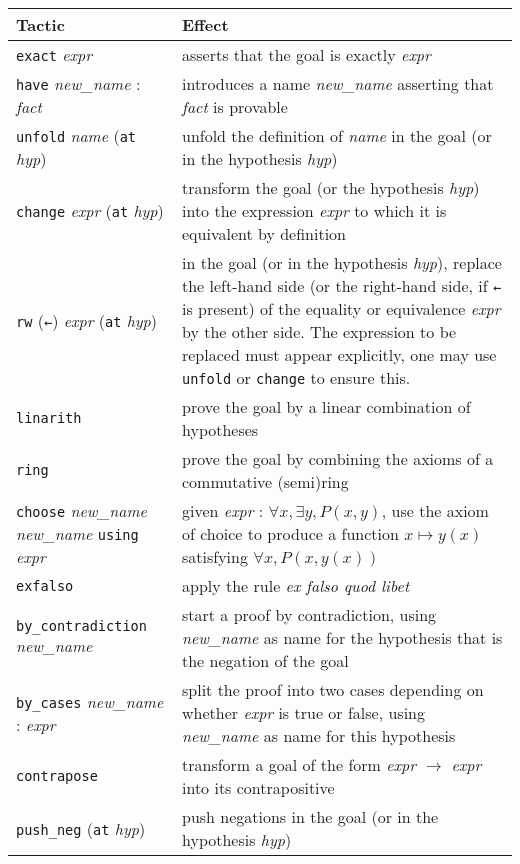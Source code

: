 \documentclass[a4paper]{article}
\newcommand{\lean}[1]{{\tt #1}}
\newcommand{\nv}{\textit{new\_name} }
\newcommand{\nom}{\textit{name} }
\newcommand{\expr}{\textit{expr} }
\newcommand{\fait}{\textit{fact} }
\newcommand{\hyp}{\textit{hyp}\xspace}
\begin{document}
\begin{center}
\setlength\tabcolsep{.5cm}
\def\arraystretch{1.6}
\begin{tabular}{@{}lp{10cm}@{}}
  \toprule
  Tactic & Effect \\
  \midrule
  \lean{exact} \expr & asserts that the goal is exactly \expr \\
  \lean{have} \nv : \fait & introduces a name \nv asserting that \fait is provable \\
  \lean{unfold} \nom (\lean{at} \hyp) & unfold the definition of \nom in the goal
  (or in the hypothesis \hyp) \\
  \lean{change} \expr (\lean{at} \hyp) & transform the goal (or the hypothesis \hyp)
  into the expression \expr to which it is equivalent by definition \\
  \lean{rw} (\lean{←}) \expr (\lean{at} \hyp) & in the goal (or in the
  hypothesis \hyp), replace the left-hand side
  (or the right-hand side, if \lean{←} is present)
  of the equality or equivalence \expr by the other side.
  The expression to be replaced must appear explicitly,
  one may use \lean{unfold} or \lean{change} to ensure this. \\
  \lean{linarith} & prove the goal by a linear combination of hypotheses \\
  \lean{ring} & prove the goal by combining the axioms of a commutative (semi)ring \\
  \lean{choose} \nv \nv \lean{using} \expr &
  given \expr : $\forall x, \exists y, P(x, y)$,
  use the axiom of choice to produce a function $x \mapsto y(x)$ satisfying
  $\forall x, P(x, y(x))$\\
  \lean{exfalso} & apply the rule \emph{ex falso quod libet} \\
  \lean{by\_contradiction} \nv & start a proof by contradiction,
  using \nv as name for the hypothesis that is the negation of the goal \\
  \lean{by\_cases} \nv : \expr & split the proof into two cases
  depending on whether \expr is true or false,
  using \nv as name for this hypothesis \\
  \lean{contrapose} & transform a goal of the form \expr $\to$ \expr
  into its contrapositive \\
  \lean{push\_neg} (\lean{at} \hyp) & push negations in the goal
  (or in the hypothesis \hyp) \\
  \bottomrule
\end{tabular}
\end{center}
\end{document}
